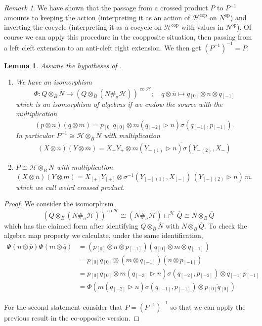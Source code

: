 \documentclass[a4paper,reqno]{amsart}
\numberwithin{equation}{section}
\theoremstyle{plain}
\newtheorem{lem}[thm]{Lemma}
\theoremstyle{remark}
\newtheorem{rem}[thm]{Remark}
\numberwithin{equation}{section}
\newcommand\inv{^{-1}}
\newcommand{\ot}{\otimes}
\newcommand\ol{\overline}
\newcommand{\BB}{\overline{B}}
\newcommand{\rz}{{}_{\scriptscriptstyle{[0]}}}
\renewcommand{\o}{{}_{\scriptscriptstyle{(1)}}}
\newcommand{\rmo}{{}_{\scriptscriptstyle{[-1]}}}
\renewcommand{\t}{{}_{\scriptscriptstyle{(2)}}}
\newcommand{\rmt}{{}_{\scriptscriptstyle{[-2]}}}
\newcommand{\rmth}{{}_{\scriptscriptstyle{[-3]}}}
\newcommand\ou[1]{\otimes_{#1}}
\newcommand{\la}{{\triangleright}}
\newcommand{\CH}{\mathcal{H}}
\newcommand{\op}{{\operatorname{op}}}
\newcommand\co{{\operatorname{co}}}
\newcommand\cop{{\operatorname{cop}}}
\begin{document}
\begin{rem}
    We have shown that the passage from a crossed product $P$ to $P\inv$ amounts to keeping the action (interpreting it as an action of $\CH^\cop$ on $N^\op$) and inverting the cocycle (interpreting it as a cocycle on $\CH^\cop$ with values in $N^\op$). Of course we can apply this procedure in the coopposite situation, then passing from a left cleft extension to an anti-cleft right extension. We then get $(P\inv)\inv=P$.
\end{rem}
\begin{lem}Assume the hypotheses of .
\begin{enumerate}
       \item We have an isomorphism 
     \[\Phi\colon Q\ou{\ol B}\ol N\to \left(Q\ou{\ol B}(N\#_\sigma\CH)\right)^{\co\CH};\quad q\ot\ol n\mapsto q\rz\ot n\ot q\rmo\]
     which is an isomorphism of algebras if we endow the source with the multiplication 
       \[(p\ot \overline{n})(q\ot \overline{m})=  p\rz q\rz\ot \overline{m(q\rmt\la n)\sigma(q\rmo,p\rmo)}.\]
     In particular $P\inv\cong \CH\ou \BB \ol N$ with multiplication 
     \begin{align}\label{equ. weird left crossed product}
         (X\ot \overline{n})(Y\ot \overline{m})= X_+Y_+\ot \overline{m(Y_{-}\o\la n)\sigma(Y_{-}\t,X_-)}
     \end{align}

     \item $P\cong \CH\ot_{B}N$ with multiplication 
     \begin{equation}\label{weird crossed product}(X\ot n)(Y\ot m)=X_{[+]}Y_{[+]}\ot \sigma^{-1}(Y_{[-]}\o, X_{[-]})\,(Y_{[-]}\t\la n)\,m.\end{equation}which we call weird crossed product.
\end{enumerate}

\end{lem}
\begin{proof}
    We consider the isomorphism 
    \[(Q\ou{\ol B}(N\#_\sigma\CH))^{\co\CH}\cong (N\#_\sigma\CH)\Box^\CH \ol Q\cong N \ou B\ol Q\] which has the claimed form after  identifying $Q\ot_{\BB}\ol N$ with $N\ot_{B} \ol Q$.         To check the algebra map property we calculate, under the same identification,
        \begin{align*}
            \Phi(n\ot \ol p)\Phi(m\ot \ol q)
            &=(p\rz\ot n\ot p\rmo)(q\rz\ot m\ot q\rmo)\\
            &=p\rz q\rz\ot (m\ot q\rmo)(n\ot p\rmo)\\
            &=p\rz q\rz\ot m(q\rmth \la n)\sigma(q\rmt,p\rmt)\ot q\rmo p\rmo\\
            &=\Phi( m(q\rmt\la n)\sigma(q\rmo,p\rmo)\ot \ol {p\rz q\rz})
        \end{align*}

    For the second statement consider that $P=(P\inv)\inv$ so that we can apply the previous result in the co-opposite version.
\end{proof}
\end{document}
